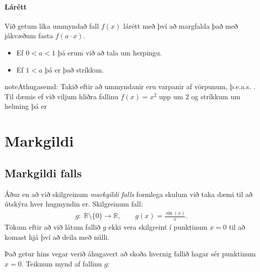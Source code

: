 \documentclass[a4paper,10pt,icelandic]{sphinxmanual}
\begin{document}
\subsubsection{Lárétt}
\label{\detokenize{Kafli09:larett}}
Við getum líka ummyndað fall \(f(x)\) lárétt með því að margfalda það með jákvæðum fasta \(f(a\cdot x)\).
\begin{itemize}
\item {} 
Ef \(0<a<1\) þá erum við að tala um herpingu.

\item {} 
Ef \(1<a\) þá er það stríkkun.

\end{itemize}

\begin{sphinxadmonition}{note}{Athugasemd:}
Takið eftir að ummyndanir eru varpanir af vörpunum, þ.e.a.s. . Til dæmis ef við viljum hliðra fallinu \(f(x) = x^2\) upp um \(2\) og stríkkum um helming þá er
\end{sphinxadmonition}


\chapter{Markgildi}
\label{\detokenize{Kafli10:markgildi}}\label{\detokenize{Kafli10::doc}}

\section{Markgildi falls}
\label{\detokenize{Kafli10:markgildi-falls}}
Áður en að við skilgreinum \textit{markgildi} \textit{falls} formlega skulum við taka dæmi til að útskýra hver hugmyndin er.
Skilgreinum fall:
\begin{equation*}
\begin{split}g:\;\mathbb{R}\setminus\{0\}\to \mathbb{R}, \qquad g(x)=\frac{\sin(x)}{x}.\end{split}
\end{equation*}
Tökum eftir að við látum fallið \(g\) ekki vera skilgreint í punktinum \(x=0\)  til að komast hjá því að deila með núlli.

Það getur hins vegar verið áhugavert að skoða hvernig fallið hagar sér  punktinum \(x=0\).
Teiknum mynd af fallinu \(g\):

\begin{figure}[htbp]
\centering

\noindent{}
\end{figure}
\end{document}
